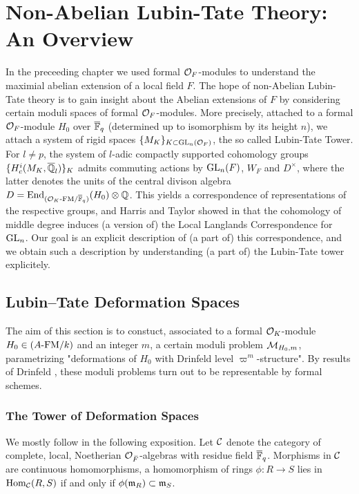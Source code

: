 \documentclass[../main.tex]{subfiles}
\begin{document}
\section{Non-Abelian Lubin-Tate Theory: An Overview} %
\label{sec:Non-Abelian Lubin-Tate Theory: An Overview}
In the preceeding chapter we used formal $\mathcal{O}_F$-modules to understand the 
maximial abelian extension of a local field $F$. The hope of non-Abelian Lubin-Tate
theory is to gain insight about the Abelian extensions of $F$ by considering
certain moduli spaces of formal $\mathcal{O}_F$-modules.
More precisely, attached to a formal $\mathcal{O}_F$-module $H_0$ over ${\overline {\mathbb{F}}_q}$ (determined
up to isomorphism by its height $n$), we attach a system of rigid spaces 
$\{M_K\}_{K \subset \operatorname{GL}_n(\mathcal{O}_F)}$, the so called Lubin-Tate Tower. For $l \neq p$, 
the system of $l$-adic compactly supported cohomology groups $\{H_c^{i}(M_K,
\overline {\mathbb{Q}}_l)\}_K$ admits commuting actions by $\operatorname{GL}_n(F)$, $W_F$ and $D^\times$,
where the latter denotes the units of the central divison algebra $D =
\operatorname{End}_{{({\mathcal{O}_K}\text-\allowbreak\mathrm{FM}/{{\overline {\mathbb{F}}_q}})}}(H_0) \otimes \mathbb{Q}$. This yields a correspondence of 
representations of the respective groups, and Harris and Taylor showed in
\cite{HTShimura} that the cohomology of middle degree induces (a version of)
the Local Langlands Correspondence for $\operatorname{GL}_n$. Our goal is an explicit
description of (a part of) this correspondence, and we obtain such a
description by understanding (a part of) the Lubin-Tate tower explicitely.

\subsection{Lubin--Tate Deformation Spaces} %
\label{sub:Lubin-Tate Deformation Spaces}
The aim of this section is to constuct, associated to a formal $\mathcal{O}_K$-module
$H_0 \in {({A}\text-\allowbreak\mathrm{FM}/{k})}$ and an integer $m$, a certain moduli problem $\mathcal{M}_{H_0, m}$,
parametrizing "deformations of $H_0$ with Drinfeld level $\varpi^m$-structure".
By results of Drinfeld \cite{drinfel1974elliptic}, these moduli problems turn
out to be representable by formal schemes. 

\subsubsection{The Tower of Deformation Spaces} %
\label{ssub:The Tower of Deformation Spaces}
We mostly follow \cite[Chapter 2]{Strauch2008DefSp} in the following
exposition. Let $\mathcal{C}$ denote the category of complete, local, Noetherian
$\mathcal{O}_{\breve {F}}$-algebras with residue field $\overline {\mathbb{F}}_q$. Morphisms in $\mathcal{C}$ are continuous
homomorphisms, a homomorphism of rings $\phi: R \to S$ lies in 
$\operatorname{Hom}_{\mathcal{C}}(R,S)$ if and only if $\phi(\mathfrak{m}_R) \subset \mathfrak{m}_S$.
\end{document}
